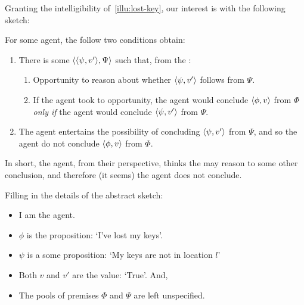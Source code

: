 \begin{note}
  Granting the intelligibility of~\autoref{illu:lost-key}, our interest is with the following sketch:

  \begin{sketch}
    \label{sketch:zS:fail}
    For some agent, the follow two conditions obtain:
    \begin{enumerate}
      \label{skech:zS:fail:curb}
    \item
    There is some \(\langle \langle \psi, v' \rangle, \Psi \rangle\) such that, from the \agpe{}:
    \begin{enumerate}[label=\alph*., ref=(\alph*)]
    \item
      \label{sketch:zS:fail:curb:opportunity}
      Opportunity to reason about whether \(\langle \psi, v' \rangle\) follows from \(\Psi\).
    \item
      \label{sketch:zS:fail:curb:conditional}
      If the agent took to opportunity, the agent would conclude \(\langle \phi, v \rangle\) from \(\Phi\) \emph{only if} the agent would conclude \(\langle \psi, v' \rangle\) from \(\Psi\).
    \end{enumerate}

  \item
    \label{sketch:zS:fail:no-c}
    The agent entertains the possibility of concluding \(\langle \psi, v' \rangle\) from \(\Psi\), and so the agent do not conclude \(\langle \phi, v \rangle\) from \(\Phi\).
  \end{enumerate}
  \vspace{-\baselineskip}
  \end{sketch}

  In short, the agent, from their perspective, thinks the may reason to some other conclusion, and therefore (it seems) the agent does not conclude.

  Filling in the details of the abstract sketch:
  \begin{itemize}[noitemsep]
  \item
    I am the agent.
  \item
    \(\phi\) is the proposition: `I've lost my keys'.
  \item
    \(\psi\) is a some proposition: `My keys are not in location \(l\)'
  \item
    Both \(v\) and \(v'\) are the value: `True'.
    And,
  \item
    The pools of premises \(\Phi\) and \(\Psi\) are left unspecified.
  \end{itemize}
\end{note}

